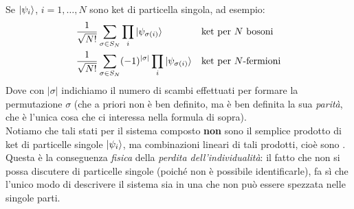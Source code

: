 \documentclass[../../FisicaTeorica.tex]{subfiles}
\begin{document}
Se $\ket{\psi_i}$, $i=1, \dots, N$ sono ket di particella singola, ad esempio:
\begin{align*}
&\frac{1}{\sqrt{N!}}\sum_{\sigma \in S_N} \prod_i \ket{\psi_{\sigma(i)}} && \text{ket per $N$ bosoni}\\
&\frac{1}{\sqrt{N!}}\sum_{\sigma \in S_N} (-1)^{|\sigma|}\prod_i \ket{\psi_{\sigma(i)}} && \text{ket per $N$-fermioni}
\end{align*}
Dove con $|\sigma|$ indichiamo il numero di scambi effettuati per formare la permutazione $\sigma$ (che a priori non è ben definito, ma è ben definita la sua \textit{parità}, che è l'unica cosa che ci interessa nella formula di sopra).\\
Notiamo che tali stati per il sistema composto \textbf{non} sono il semplice prodotto di ket di particelle singole $\ket{\psi_i}$, ma combinazioni lineari di tali prodotti, cioè sono . Questa è la conseguenza \textit{fisica} della \textit{perdita dell'individualità}: il fatto che non si possa discutere di particelle singole (poiché non è possibile identificarle), fa sì che l'unico modo di descrivere il sistema sia in una  che non può essere spezzata nelle singole parti.\\
\end{document}
